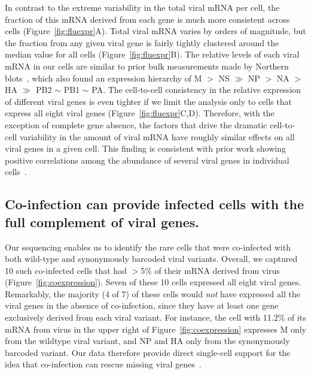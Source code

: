 \documentclass[9pt,lineno]{elife}
\begin{document}
In contrast to the extreme variability in the total viral mRNA per cell, the fraction of this mRNA derived from each gene is much more consistent across cells (Figure~\ref{fig:fluexpr}A).
Total viral mRNA varies by orders of magnitude, but the fraction from any given viral gene is fairly tightly clustered around the median value for all cells (Figure~\ref{fig:fluexpr}B).
The relative levels of each viral mRNA in our cells are similar to prior bulk measurements made by Northern blots~\citep{Hatada:1989vz}, which also found an expression hierarchy of M $>$ NS $\gg$ NP $>$ NA $>$ HA $\gg$ PB2 $\sim$ PB1 $\sim$ PA.
The cell-to-cell consistency in the relative expression of different viral genes is even tighter if we limit the analysis only to cells that express all eight viral genes (Figure~\ref{fig:fluexpr}C,D).
Therefore, with the exception of complete gene absence, the factors that drive the dramatic cell-to-cell variability in the amount of viral mRNA have roughly similar effects on all viral genes in a given cell.
This finding is consistent with prior work showing positive correlations among the abundance of several viral genes in individual cells~\citep{Heldt:2015iz}.

\subsection{Co-infection can provide infected cells with the full complement of viral genes.}
Our sequencing enables us to identify the rare cells that were co-infected with both wild-type and synonymously barcoded viral variants.
Overall, we captured 10 such co-infected cells that had $>$5\% of their mRNA derived from virus (Figure~\ref{fig:coexpression}).
Seven of these 10 cells expressed all eight viral genes.
Remarkably, the majority (4 of 7) of these cells would \emph{not} have expressed all the viral genes in the absence of co-infection, since they have at least one gene exclusively derived from each viral variant.
For instance, the cell with 11.2\% of its mRNA from virus in the upper right of Figure~\ref{fig:coexpression} expresses M only from the wildtype viral variant, and NP and HA only from the synonymously barcoded variant.
Our data therefore provide direct single-cell support for the idea that co-infection can rescue missing viral genes~\citep{Brooke:2013kb,Fonville:2015cg,aguilera2017plaques}.
\end{document}
